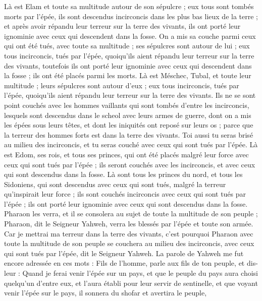 \begin{multicols}{2}
Là est Elam et toute sa multitude autour de son sépulcre ; eux tous sont tombés morts par l'épée, ils sont descendus incirconcis dans les plus bas lieux de la terre ; et après avoir répandu leur terreur sur la terre des vivants, ils ont porté leur ignominie avec ceux qui descendent dans la fosse.
On a mis sa couche parmi ceux qui ont été tués, avec toute sa multitude ; ses sépulcres sont autour de lui ; eux tous incirconcis, tués par l'épée, quoiqu'ils aient répandu leur terreur sur la terre des vivants, toutefois ils ont porté leur ignominie avec ceux qui descendent dans la fosse ; ils ont été placés parmi les morts.
Là est Méschec, Tubal, et toute leur multitude ; leurs sépulcres sont autour d'eux ; eux tous incirconcis, tués par l'épée, quoiqu'ils aient répandu leur terreur sur la terre des vivants.
Ils ne se sont point couchés avec les hommes vaillants qui sont tombés d'entre les incirconcis, lesquels sont descendus dans le scheol avec leurs armes de guerre, dont on a mis les épées sous leurs têtes, et dont les iniquités ont reposé sur leurs os ; parce que la terreur des hommes forts est dans la terre des vivants.
Toi aussi tu seras brisé au milieu des incirconcis, et tu seras couché avec ceux qui sont tués par l'épée.
Là est Edom, ses rois, et tous ses princes, qui ont été placés malgré leur force avec ceux qui sont tués par l'épée ; ils seront couchés avec les incirconcis, et avec ceux qui sont descendus dans la fosse.
Là sont tous les princes du nord, et tous les Sidoniens, qui sont descendus avec ceux qui sont tués, malgré la terreur qu’inspirait leur force ; ils sont couchés incirconcis avec ceux qui sont tués par l'épée ; ils ont porté leur ignominie avec ceux qui sont descendus dans la fosse.
Pharaon les verra, et il se consolera au sujet de toute la multitude de son peuple ; Pharaon, dit le Seigneur Yahweh, verra les blessés par l'épée et toute son armée.
Car je mettrai ma terreur dans la terre des vivants, c'est pourquoi Pharaon avec toute la multitude de son peuple se couchera au milieu des incirconcis, avec ceux qui sont tués par l'épée, dit le Seigneur Yahweh.
\VerseOne{}La parole de Yahweh me fut encore adressée en ces mots :
Fils de l’homme, parle aux fils de ton peuple, et dis-leur : Quand je ferai venir l'épée sur un pays, et que le peuple du pays aura choisi quelqu'un d'entre eux, et l'aura établi pour leur servir de sentinelle,
et que voyant venir l'épée sur le pays, il sonnera du shofar et avertira le peuple,

\end{multicols}
